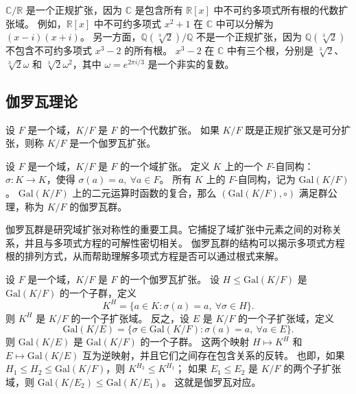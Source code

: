 \begin{note}
    $\mathbb{C}/\mathbb{R}$ 是一个正规扩张，因为 $\mathbb{C}$ 是包含所有 $\mathbb{R}[x]$ 中不可约多项式所有根的代数扩张域。
    例如，$\mathbb{R}[x]$ 中不可约多项式 $x^2+1$ 在 $\mathbb{C}$ 中可以分解为 $(x-i)(x+i)$。
    另一方面，$\mathbb{Q}(\sqrt[3]{2})/\mathbb{Q}$ 不是一个正规扩张，因为 $\mathbb{Q}(\sqrt[3]{2})$ 不包含不可约多项式 $x^3-2$ 的所有根。
    $x^3-2$ 在 $\mathbb{C}$ 中有三个根，分别是 $\sqrt[3]{2}$、$\sqrt[3]{2}\omega$ 和 $\sqrt[3]{2}\omega^2$，其中 $\omega = e^{2\pi i/3}$ 是一个非实的复数。
\end{note}
\vspace{1em}

\subsection{伽罗瓦理论}

\begin{definition}
    设 $F$ 是一个域，$K/F$ 是 $F$ 的一个代数扩张。
    如果 $K/F$ 既是正规扩张又是可分扩张，则称 $K/F$ 是一个伽罗瓦扩张。
    \label{def:galois_extension}
\end{definition}

\begin{definition}
    设 $F$ 是一个域，$K/F$ 是 $F$ 的一个域扩张。
    定义 $K$ 上的一个 $F$-自同构：$\sigma:K\to K$，使得 $\sigma(a)=a,\ \forall a\in F$。
    所有 $K$ 上的 $F$-自同构，记为 $\mathrm{Gal}(K/F)$。
    $\mathrm{Gal}(K/F)$ 上的二元运算时函数的复合，那么 $(\mathrm{Gal}(K/F),\circ)$ 满足群公理，称为 $K/F$ 的伽罗瓦群。
    \label{def:galois_group}
\end{definition}

\begin{note}
    伽罗瓦群是研究域扩张对称性的重要工具。它捕捉了域扩张中元素之间的对称关系，并且与多项式方程的可解性密切相关。
    伽罗瓦群的结构可以揭示多项式方程根的排列方式，从而帮助理解多项式方程是否可以通过根式来解。
\end{note}

\begin{definition}
    设 $F$ 是一个域，$K/F$ 是 $F$ 的一个伽罗瓦扩张。
    设 $H \leq \mathrm{Gal}(K/F)$ 是 $\mathrm{Gal}(K/F)$ 的一个子群，定义
    \[
        K^H = \{a\in K:\sigma(a)=a,\ \forall \sigma\in H\}.
    \]
    则 $K^H$ 是 $K/F$ 的一个子扩张域。
    反之，设 $E$ 是 $K/F$ 的一个子扩张域，定义
    \[
        \mathrm{Gal}(K/E) = \{\sigma\in \mathrm{Gal}(K/F):\sigma(a)=a,\ \forall a\in E\}.
    \]
    则 $\mathrm{Gal}(K/E)$ 是 $\mathrm{Gal}(K/F)$ 的一个子群。
    这两个映射 $H\mapsto K^H$ 和 $E\mapsto \mathrm{Gal}(K/E)$ 互为逆映射，并且它们之间存在包含关系的反转。
    也即，如果 $H_1 \leq H_2 \leq \mathrm{Gal}(K/F)$，则 $K^{H_2} \leq K^{H_1}$；
    如果 $E_1 \leq E_2$ 是 $K/F$ 的两个子扩张域，则 $\mathrm{Gal}(K/E_2) \leq \mathrm{Gal}(K/E_1)$。
    这就是伽罗瓦对应。
    \label{def:galois_correspondence}
\end{definition}

